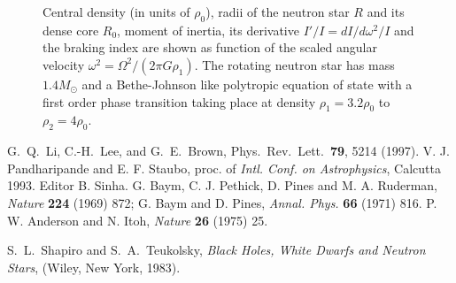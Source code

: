 \clearpage

\begin{figure}
\centerline{
}
\caption{ 
Central density (in units of $\rho_0$), radii of the neutron star $R$ and 
its dense core $R_0$, moment of inertia, its derivative
$I'/I=dI/d\omega^2/I$ and the braking index
are shown as function of the scaled angular velocity
$\omega^2=\Omega^2/(2\pi G\rho_1)$.
The rotating neutron star has mass $1.4M_\odot$ and a Bethe-Johnson like
polytropic
equation of state with a first order phase transition taking
place at density $\rho_1=3.2\rho_0$ to $\rho_2=4\rho_0$.
\label{rot}  }
\end{figure}




 G.\ Q.\ Li, C.-H.\ Lee, and G.\ E.\ Brown,
                       Phys.\ Rev.\ Lett.\ {\bf 79}, 5214 (1997).
 V. J. Pandharipande and E. F. Staubo, proc. of
    {\it Intl. Conf. on Astrophysics}, Calcutta 1993. Editor B. Sinha.
 G. Baym, C. J. Pethick, D. Pines and M. A. Ruderman,
             {\it Nature} {\bf 224} (1969) 872; 
             G. Baym and D. Pines, {\it Annal. Phys.} {\bf 66} (1971) 816.
 P. W. Anderson and N. Itoh, {\it Nature} {\bf 26} (1975) 25.

 S.\ L.\ Shapiro and S.\ A.\ Teukolsky, {\em Black Holes, 
             White Dwarfs and Neutron Stars}, (Wiley, New York, 1983).

